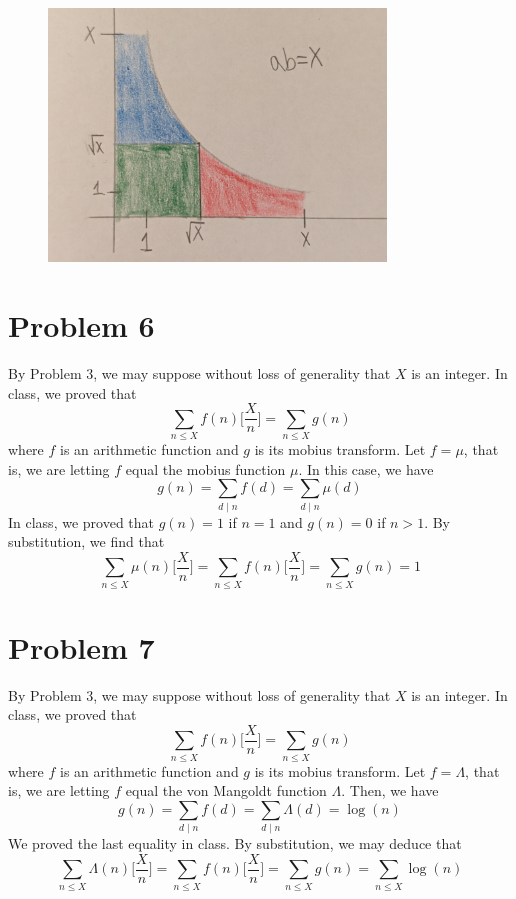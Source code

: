 \documentclass[12pt]{article}
\begin{document}
\begin{figure}[H]
\centering
\includegraphics[width=0.8\textwidth]{Problem5Image1}
\end{figure} 
\newpage
\section*{Problem 6}
By Problem $3$, we may suppose without loss of generality that $X$ is an integer. In class, we proved that
\[
\sum_{n \leq X} f(n) \bigg[ \frac{X}{n} \bigg] =  \sum_{n \leq X} g(n)
\] where $f$ is an arithmetic function and $g$ is its mobius transform. Let $f = \mu$, that is, we are letting $f$ equal the mobius function $\mu$. In this case, we have
\[
g(n) = \sum_{d \mid n} f(d) = \sum_{d \mid n}  \mu(d)
\] In class, we proved that $g(n) = 1$ if $n=1$ and $g(n) = 0$ if $n > 1$. By substitution, we find that
\[
\sum_{n \leq X} \mu(n) \bigg[ \frac{X}{n} \bigg] = \sum_{n \leq X} f(n) \bigg[ \frac{X}{n} \bigg] = \sum_{n \leq X} g(n) = 1
\]
\newpage
\section*{Problem 7}
By Problem $3$, we may suppose without loss of generality that $X$ is an integer. In class, we proved that
\[
\sum_{n \leq X} f(n) \bigg[ \frac{X}{n} \bigg] =  \sum_{n \leq X} g(n)
\] where $f$ is an arithmetic function and $g$ is its mobius transform. Let $f = \Lambda$, that is, we are letting $f$ equal the von Mangoldt function $\Lambda$. Then, we have
\[
g(n) = \sum_{d\mid n} f(d) =  \sum_{d\mid n} \Lambda (d) = \log(n)
\] We proved the last equality in class. By substitution, we may deduce that
\[
\sum_{n \leq X} \Lambda(n) \bigg[ \frac{X}{n} \bigg] = \sum_{n \leq X} f(n) \bigg[ \frac{X}{n} \bigg]  =  \sum_{n \leq X} g(n) = \sum_{n \leq X} \log(n)
\]
 
\end{document}
